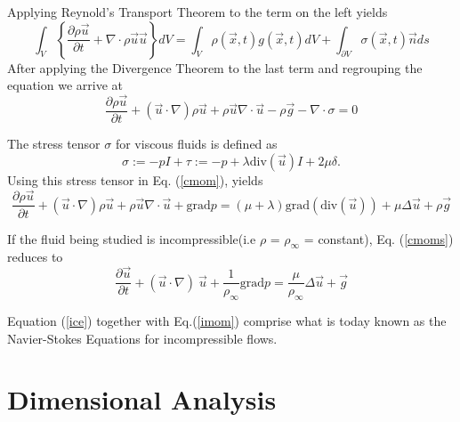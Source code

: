 Applying Reynold's Transport Theorem to the term on the left yields \begin{equation} \int_{V} \left\{\frac{\partial \rho \stackrel{\rightarrow}{u}}{\partial t} + \nabla \cdot \rho \stackrel{\rightarrow}{u}\stackrel{\rightarrow}{u}\right\}dV = \int_{V} \rho(\stackrel{\rightarrow}{x},t) g(\stackrel{\rightarrow}{x},t)dV + \int_{\partial V} \sigma(\stackrel{\rightarrow}{x},t)\stackrel{\rightarrow}{n}ds \end{equation}
After applying the Divergence Theorem to the last term and regrouping the equation we arrive at \begin{equation} \label{cmom}\frac{\partial \rho \stackrel{\rightarrow}{u}}{\partial t} + (\stackrel{\rightarrow}{u} \cdot \nabla)\rho\stackrel{\rightarrow}{u} + \rho\stackrel{\rightarrow}{u}\nabla \cdot \stackrel{\rightarrow}{u} - \rho \stackrel{\rightarrow}{g} - \nabla \cdot \sigma = 0 \end{equation}

The stress tensor $\sigma$ for viscous fluids is defined as \begin{equation} \sigma := -pI + \tau := -p + \lambda \mbox{div}(\stackrel{\rightarrow}{u})I + 2\mu\delta. \end{equation} Using this stress tensor in Eq. (\ref{cmom}), yields \begin{equation}\label{cmoms} \frac{\partial \rho \stackrel{\rightarrow}{u}}{\partial t} + (\stackrel{\rightarrow}{u} \cdot \nabla)\rho\stackrel{\rightarrow}{u} + \rho\stackrel{\rightarrow}{u}\nabla \cdot \stackrel{\rightarrow}{u} + \mbox{grad}p = (\mu + \lambda)\mbox{grad}(\mbox{div}(\stackrel{\rightarrow}{u})) + \mu\Delta\stackrel{\rightarrow}{u} + \rho\stackrel{\rightarrow}{g} \end{equation}

If the fluid being studied is incompressible(i.e $\rho$ = $\rho_{\infty}$ = constant), Eq. (\ref{cmoms}) reduces to \begin{equation} \label{imom}\frac{\partial \stackrel{\rightarrow}{u}}{\partial t} + (\stackrel{\rightarrow}{u} \cdot \nabla)\ \stackrel{\rightarrow}{u} + \frac{1}{\rho_{\infty}}\mbox{grad}p = \frac{\mu}{\rho_{\infty}}\Delta\stackrel{\rightarrow}{u} + \stackrel{\rightarrow}{g} \end{equation}

Equation (\ref{ice}) together with Eq.(\ref{imom}) comprise what is today known as the Navier-Stokes Equations for incompressible flows.

\section{Dimensional Analysis}

